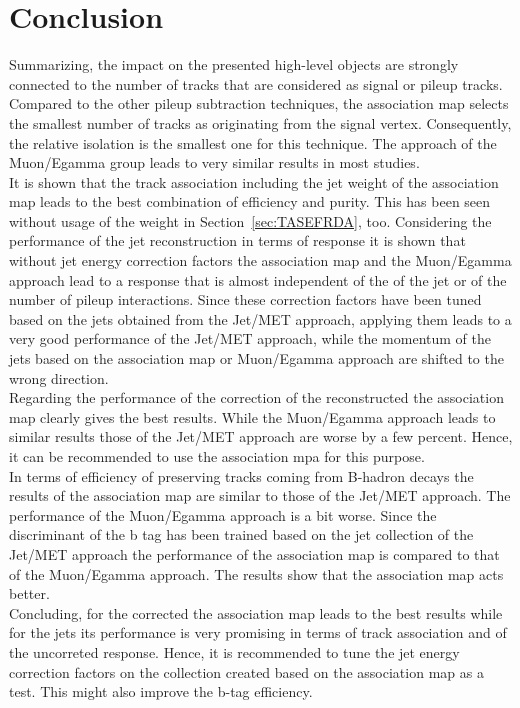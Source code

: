 \section{Conclusion}

Summarizing, the impact on the presented high-level objects are strongly connected to the number of tracks that are considered as signal or pileup tracks. Compared to the other pileup subtraction techniques, the association map selects the smallest number of tracks as originating from the signal vertex. Consequently, the relative isolation is the smallest one for this technique. The approach of the Muon/Egamma group leads to very similar results in most studies. \\
It is shown that the track association including the jet weight of the association map leads to the best combination of efficiency and purity. This has been seen without usage of the weight in Section~\ref{sec:TASEFRDA}, too. Considering the performance of the jet reconstruction in terms of \pt{} response it is shown that without jet energy correction factors the association map and the Muon/Egamma approach lead to a \pt{} response that is almost independent of the \pt{} of the jet or of the number of pileup interactions. Since these correction factors have been tuned based on the jets obtained from the Jet/MET approach, applying them leads to a very good performance of the Jet/MET approach, while the momentum of the jets based on the association map or Muon/Egamma approach are shifted to the wrong direction. \\
Regarding the performance of the correction of the reconstructed \MET{} the association map clearly gives the best results. While the Muon/Egamma approach leads to similar results those of the Jet/MET approach are worse by a few percent. Hence, it can be recommended to use the association mpa for this purpose.\\
In terms of efficiency of preserving tracks coming from B-hadron decays the results of the association map are similar to those of the Jet/MET approach. The performance of the Muon/Egamma approach is a bit worse. Since the discriminant of the b tag has been trained based on the jet collection of the Jet/MET approach the performance of the association map is compared to that of the Muon/Egamma approach. The results show that the association map acts better. \\
Concluding, for the corrected \MET{} the association map leads to the best results while for the jets its performance is very promising in terms of track association and of the uncorreted \pt{} response. Hence, it is recommended to tune the jet energy correction factors on the collection created based on the association map as a test. This might also improve the b-tag efficiency.